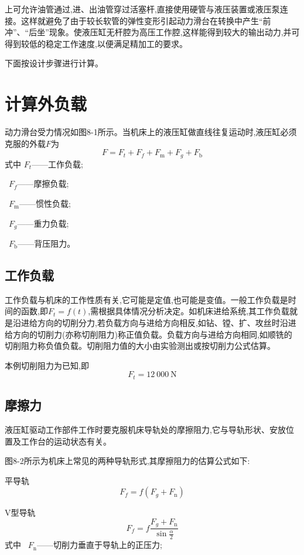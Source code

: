 
\noindent 上可允许油管通过,进、出油管穿过活塞杆,直接使用硬管与液压装置或液压泵连接。这样就避免了由于较长软管的弹性变形引起动力滑台在转换中产生“前冲”、“后坐”现象。使液压缸无杆腔为高压工作腔,这样能得到较大的输出动力,并可得到较低的稳定工作速度,以便满足精加工的要求。

下面按设计步骤进行计算。

\section{计算外负载}
动力滑台受力情况如图8-1所示。当机床上的液压缸做直线往复运动时,液压缸必须克服的外载$F$为
\begin{equation}
    F=F_t +F_f+F_{\text{m}}+F_g+F_{\text{b}}
\end{equation}
式中
$F_t$——工作负载;

\ $F_f$——摩擦负载;

\ $F_{\text{m}}$——惯性负载;

\ $F_g$——重力负载;

\ $F_{\text{b}}$——背压阻力。

\subsection{工作负载}
工作负载与机床的工作性质有关,它可能是定值,也可能是变值。一般工作负载是时间的函数,即$F_t=f(t)$,需根据具体情况分析决定。如机床进给系统,其工作负载就是沿进给方向的切削分力,若负载方向与进给方向相反,如钻、镗、扩、攻丝时沿进给方向的切削力(亦称切削阻力)称正值负载。负载方向与进给方向相同,如顺铣的切削阻力称负值负载。切削阻力值的大小由实验测出或按切削力公式估算。

本例切削阻力为已知,即$$F_t=12\ 000\ \text{N}$$

\subsection{摩擦力}
液压缸驱动工作部件工作时要克服机床导轨处的摩擦阻力,它与导轨形状、安放位置及工作台的运动状态有关。

图8-2所示为机床上常见的两种导轨形式,其摩擦阻力的估算公式如下:

平导轨
\begin{equation}
    \label{8-2}
    F_f=f(F_g+ F_{\text{n}})
\end{equation}

V型导轨
\begin{equation}
    \label{8-3}
    F_f=f\frac{F_g+ F_{\text{n}}}{\sin{\frac{\alpha}{2}}}
\end{equation}
式中
\ $F_{\text{n}}$——切削力垂直于导轨上的正压力;

